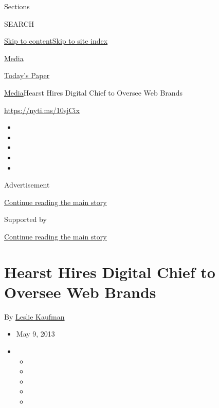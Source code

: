 Sections

SEARCH

\protect\hyperlink{site-content}{Skip to
content}\protect\hyperlink{site-index}{Skip to site index}

\href{https://www.nytimes3xbfgragh.onion/pages/business/media/index.html}{Media}

\href{https://myaccount.nytimes3xbfgragh.onion/auth/login?response_type=cookie\&client_id=vi}{}

\href{https://www.nytimes3xbfgragh.onion/section/todayspaper}{Today's
Paper}

\href{/pages/business/media/index.html}{Media}\textbar{}Hearst Hires
Digital Chief to Oversee Web Brands

\url{https://nyti.ms/10sjCix}

\begin{itemize}
\item
\item
\item
\item
\item
\end{itemize}

Advertisement

\protect\hyperlink{after-top}{Continue reading the main story}

Supported by

\protect\hyperlink{after-sponsor}{Continue reading the main story}

\hypertarget{hearst-hires-digital-chief-to-oversee-web-brands}{%
\section{Hearst Hires Digital Chief to Oversee Web
Brands}\label{hearst-hires-digital-chief-to-oversee-web-brands}}

By \href{https://www.nytimes3xbfgragh.onion/by/leslie-kaufman}{Leslie
Kaufman}

\begin{itemize}
\item
  May 9, 2013
\item
  \begin{itemize}
  \item
  \item
  \item
  \item
  \item
  \end{itemize}
\end{itemize}

